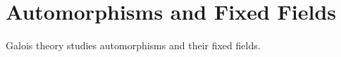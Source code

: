 \section{Automorphisms and Fixed Fields}
\label{sec:automorphisms-fixedfields}

Galois theory studies automorphisms and their fixed fields.
